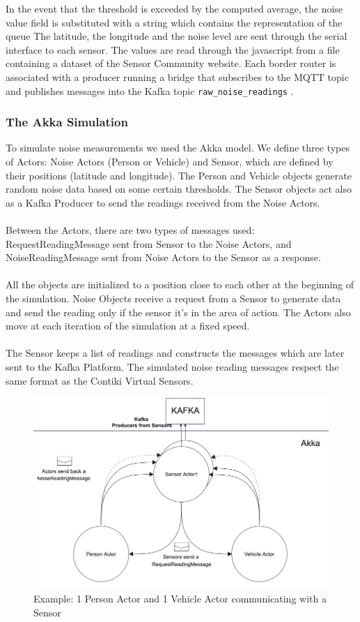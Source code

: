 \documentclass{article}
\begin{document}
In the event that the threshold is exceeded by the computed average, the noise value field is substituted with a string which contains the representation of the queue
The latitude, the longitude and the noise level are sent through the serial interface to each sensor. The values are read through the javascript from a file containing a dataset of the Sensor Community website.
Each border router is associated with a producer running a bridge that subscribes to the MQTT topic and publishes messages into the Kafka topic \texttt{raw\_noise\_readings} .

\subsubsection{The Akka Simulation}

To simulate noise measurements we used the Akka model. We define three types of Actors: Noise Actors (Person or Vehicle) and Sensor, which are defined by their positions (latitude and longitude). The Person and Vehicle objects generate random noise data based on some certain thresholds. The Sensor objects act also as a Kafka Producer to send the readings received from the Noise Actors. 
\\
\\
Between the Actors, there are two types of messages used: RequestReadingMessage sent from Sensor to the Noise Actors, and NoiseReadingMessage sent from Noise Actors to the Sensor as a response. 
\\
\\
All the objects are initialized to a position close to each other at the beginning of the simulation. Noise Objects receive a request from a Sensor to generate data and send the reading only if the sensor it's in the area of action. The Actors also move at each iteration of the simulation at a fixed speed.
\\
\\
The Sensor keeps a list of readings and constructs the messages which are later sent to the Kafka Platform. The simulated noise reading messages respect the same format as the Contiki Virtual Sensors. 

\begin{figure}[htp]
	\centering
	\includegraphics[width=0.9\linewidth]{resources/akka_archi.png}
	\caption{Example: 1 Person Actor and 1 Vehicle Actor communicating with a Sensor}
	\label{fig:akka_archi}
\end{figure}
\end{document}
